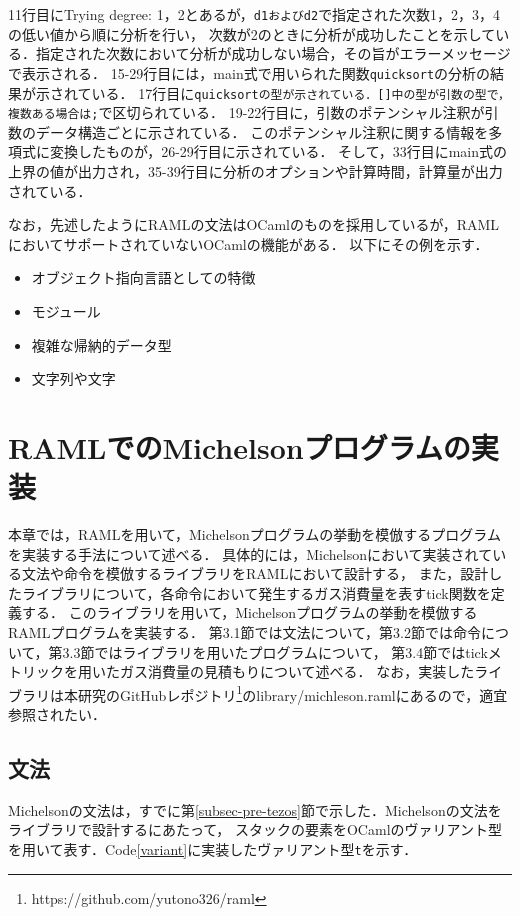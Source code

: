 \documentclass{kuisthesis}
\begin{document}
11行目にTrying degree: 1，2とあるが，{\tt d1およびd2}で指定された次数1，2，3，4の低い値から順に分析を行い，
次数が2のときに分析が成功したことを示している．指定された次数において分析が成功しない場合，その旨がエラーメッセージで表示される．
15-29行目には，main式で用いられた関数{\tt quicksort}の分析の結果が示されている．
17行目に{\tt quicksortの型が示されている．[]中の型が引数の型で，複数ある場合は;}で区切られている．
19-22行目に，引数のポテンシャル注釈が引数のデータ構造ごとに示されている．
このポテンシャル注釈に関する情報を多項式に変換したものが，26-29行目に示されている．
そして，33行目にmain式の上界の値が出力され，35-39行目に分析のオプションや計算時間，計算量が出力されている．

なお，先述したようにRAMLの文法はOCamlのものを採用しているが，RAMLにおいてサポートされていないOCamlの機能がある．
以下にその例を示す．
\begin{itemize}
  \item オブジェクト指向言語としての特徴
  \item モジュール
  \item 複雑な帰納的データ型
  \item 文字列や文字
\end{itemize}


\section{RAMLでのMichelsonプログラムの実装} \label{sec-program}
本章では，RAMLを用いて，Michelsonプログラムの挙動を模倣するプログラムを実装する手法について述べる．
具体的には，Michelsonにおいて実装されている文法や命令を模倣するライブラリをRAMLにおいて設計する，
また，設計したライブラリについて，各命令において発生するガス消費量を表すtick関数を定義する．
このライブラリを用いて，Michelsonプログラムの挙動を模倣するRAMLプログラムを実装する．
第3.1節では文法について，第3.2節では命令について，第3.3節ではライブラリを用いたプログラムについて，
第3.4節ではtickメトリックを用いたガス消費量の見積もりについて述べる．
なお，実装したライブラリは本研究のGitHubレポジトリ\footnote{https://github.com/yutono326/raml}のlibrary/michleson.ramlにあるので，適宜参照されたい．

\subsection{文法} \label{subsec-pro-grammar}
Michelsonの文法は，すでに第\ref{subsec-pre-tezos}節で示した．Michelsonの文法をライブラリで設計するにあたって，
スタックの要素をOCamlのヴァリアント型を用いて表す．Code\ref{variant}に実装したヴァリアント型{\tt t}を示す．
\end{document}
